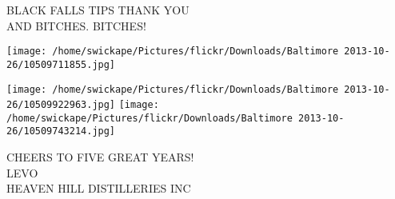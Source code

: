 \documentclass[10pt,letterpaper]{article}
\begin{document}
BLACK FALLS TIPS THANK YOU\\
AND BITCHES.  BITCHES!\\
\pagebreak

\texttt{[image: /home/swickape/Pictures/flickr/Downloads/Baltimore 2013-10-26/10509711855.jpg]}

\vspace{0.25in}
\texttt{[image: /home/swickape/Pictures/flickr/Downloads/Baltimore 2013-10-26/10509922963.jpg]}
\texttt{[image: /home/swickape/Pictures/flickr/Downloads/Baltimore 2013-10-26/10509743214.jpg]}

CHEERS TO FIVE GREAT YEARS!\\
LEVO\\
HEAVEN HILL DISTILLERIES INC\\
\pagebreak
\end{document}
